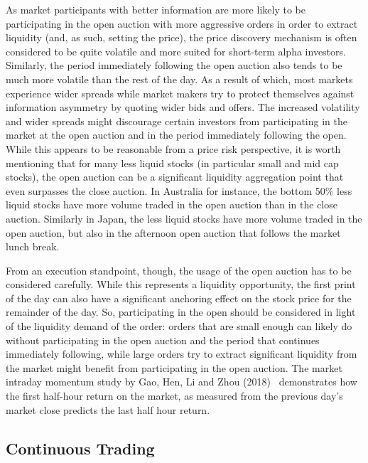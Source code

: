 As market participants with better information are more likely to be participating in the open auction with more aggressive orders in order to extract liquidity (and, as such, setting the price), the price discovery mechanism is often considered to be quite volatile and more suited for short-term alpha investors. Similarly, the period immediately following the open auction also tends to be much more volatile than the rest of the day. As a result of which, most markets experience wider spreads while market makers try to protect themselves against information asymmetry by quoting wider bids and offers. The increased volatility and wider spreads might discourage certain investors from participating in the market at the open auction and in the period immediately following the open. While this appears to be reasonable from a price risk perspective, it is worth mentioning that for many less liquid stocks (in particular small and mid cap stocks), the open auction can be a significant liquidity aggregation point that even surpasses the close auction. In Australia for instance, the bottom 50\% less liquid stocks have more volume traded in the open auction than in the close auction. Similarly in Japan, the less liquid stocks have more volume traded in the open auction, but also in the afternoon open auction that follows the market lunch break. 


From an execution standpoint, though, the usage of the open auction has to be considered carefully. While this represents a liquidity opportunity, the first print of the day can also have a significant anchoring effect on the stock price for the remainder of the day. So, participating in the open should be considered in light of the liquidity demand of the order: orders that are small enough can likely do without participating in the open auction and the period that continues immediately following, while large orders try to extract significant liquidity from the market might benefit from participating in the open auction. The market intraday momentum study by Gao, Hen, Li and Zhou (2018)~\cite{ghliz} demonstrates how the first half-hour return on the market, as measured from the previous day's market close predicts the last half hour return.



\subsection{Continuous Trading\label{sec:continuous_trading}} \label{in:cont_trade1}

